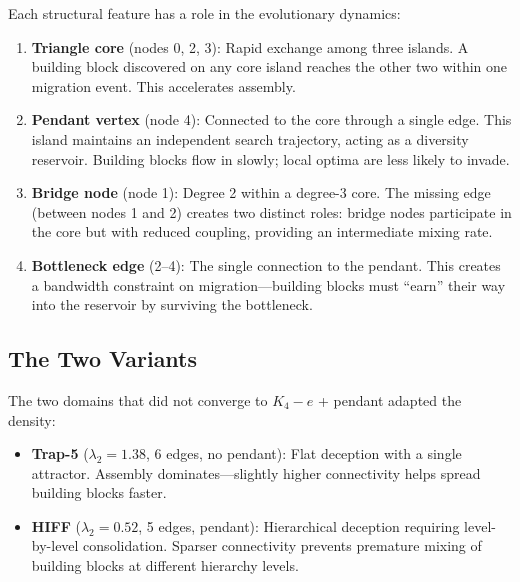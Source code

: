 \documentclass[sigconf,nonacm]{acmart}
\begin{document}
Each structural feature has a role in the evolutionary dynamics:

\begin{enumerate}
\item \textbf{Triangle core} (nodes 0, 2, 3): Rapid exchange among
  three islands. A building block discovered on any core island reaches
  the other two within one migration event. This accelerates assembly.

\item \textbf{Pendant vertex} (node 4): Connected to the core through
  a single edge. This island maintains an independent search trajectory,
  acting as a diversity reservoir. Building blocks flow in slowly;
  local optima are less likely to invade.

\item \textbf{Bridge node} (node 1): Degree 2 within a degree-3 core.
  The missing edge (between nodes 1 and 2) creates two distinct roles:
  bridge nodes participate in the core but with reduced coupling,
  providing an intermediate mixing rate.

\item \textbf{Bottleneck edge} (2--4): The single connection to the
  pendant. This creates a bandwidth constraint on migration---building
  blocks must ``earn'' their way into the reservoir by surviving the
  bottleneck.
\end{enumerate}

\subsection{The Two Variants}

The two domains that did not converge to $K_4 - e$ + pendant adapted
the density:

\begin{itemize}
\item \textbf{Trap-5} ($\lambda_2 = 1.38$, 6 edges, no pendant):
  Flat deception with a single attractor. Assembly dominates---slightly
  higher connectivity helps spread building blocks faster.

\item \textbf{HIFF} ($\lambda_2 = 0.52$, 5 edges, pendant):
  Hierarchical deception requiring level-by-level consolidation.
  Sparser connectivity prevents premature mixing of building blocks
  at different hierarchy levels.
\end{itemize}

\end{document}
